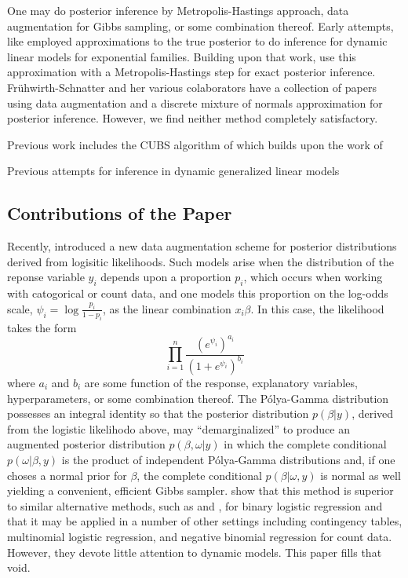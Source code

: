 \documentclass[11pt]{article}
\newcommand{\Polya}{P\'{o}lya}
\begin{document}
One may do posterior inference by Metropolis-Hastings approach, data
augmentation for Gibbs sampling, or some combination thereof.  Early attempts,
like \cite{west-etal-1985} employed approximations to the true posterior to do
inference for dynamic linear models for exponential families.  Building upon
that work, \cite{ravines-etal-2006} use this approximation with a
Metropolis-Hastings step for exact posterior inference.  Fr\"{u}hwirth-Schnatter
and her various colaborators have a collection of papers using data augmentation
and a discrete mixture of normals approximation for posterior inference.
However, we find neither method completely satisfactory.

Previous work
includes the CUBS algorithm of \cite{ravines-etal-2006} which builds upon the
work of \cite{west-etal-1985}

Previous attempts for inference in dynamic generalized linear models 

\subsection{Contributions of the Paper}



Recently, \cite{polson-etal-2012} introduced a new data augmentation scheme for
posterior distributions derived from logisitic likelihoods.  Such models arise
when the distribution of the reponse variable $y_i$ depends upon a proportion
$p_i$, which occurs when working with catogorical or count data, and one models
this proportion on the log-odds scale, $\psi_i = \log \frac{p_i}{1-p_i}$, as the
linear combination $x_i \beta$.  In this case, the likelihood takes the form
\[
\prod_{i=1}^n \frac{ (e^{\psi_i})^{a_i} }{ (1 + e^{\psi_i})^{b_i} }
\]
where $a_i$ and $b_i$ are some function of the response, explanatory variables,
hyperparameters, or some combination thereof.  The \Polya-Gamma distribution
possesses an integral identity so that the posterior distribution $p(\beta |
y)$, derived from the logistic likelihodo above, may ``demarginalized'' to
produce an augmented posterior distribution $p(\beta, \omega | y)$ in which the
complete conditional $p(\omega | \beta, y)$ is the product of independent
\Polya-Gamma distributions and, if one choses a normal prior for $\beta$, the
complete conditional $p(\beta | \omega, y)$ is normal as well yielding a
convenient, efficient Gibbs sampler.  \cite{polson-etal-2012} show that this
method is superior to similar alternative methods, such as
\cite{holmes-held-2006} and \cite{fruhwirth-schnatter-fruhwirth-2007}, for
binary logistic regression and that it may be applied in a number of other
settings including contingency tables, multinomial logistic regression, and
negative binomial regression for count data.  However, they devote little
attention to dynamic models.  This paper fills that void.
\end{document}

